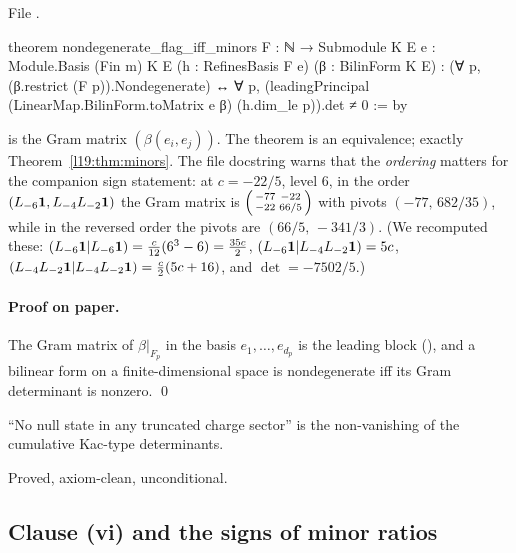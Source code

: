\noindent File .
\begin{leancode}
theorem nondegenerate_flag_iff_minors {F : ℕ → Submodule K E} {e : Module.Basis (Fin m) K E}
    (h : RefinesBasis F e) (β : BilinForm K E) :
    (∀ p, (β.restrict (F p)).Nondegenerate)
      ↔ ∀ p, (leadingPrincipal (LinearMap.BilinForm.toMatrix e β) (h.dim_le p)).det ≠ 0 := by
\end{leancode}

\begin{dictionary}
 is the Gram matrix $(\beta(e_i,e_j))$. The theorem is an
equivalence; exactly Theorem~\ref{l19:thm:minors}. The file docstring warns that the
\emph{ordering} matters for the companion sign statement: at $c=-22/5$, level $6$, in the order
$(L_{-6}\mathbf{1},L_{-4}L_{-2}\mathbf{1})$ the Gram matrix is
$\begin{psmallmatrix}-77&-22\\-22&66/5\end{psmallmatrix}$ with pivots $(-77,\,682/35)$, while in the
reversed order the pivots are $(66/5,\,-341/3)$. (We recomputed these: $(L_{-6}\mathbf{1}|L_{-6}\mathbf{1})
= \tfrac{c}{12}(6^3-6) = \tfrac{35c}{2}$, $(L_{-6}\mathbf{1}|L_{-4}L_{-2}\mathbf{1}) = 5c$,
$(L_{-4}L_{-2}\mathbf{1}|L_{-4}L_{-2}\mathbf{1}) = \tfrac c2(5c+16)$, and $\det = -7502/5$.)
\end{dictionary}

\paragraph{Proof on paper.} The Gram matrix of $\beta|_{F_p}$ in the basis $e_1,\dots,e_{d_p}$ is the
leading block (), and a bilinear form on a finite-dimensional space
is nondegenerate iff its Gram determinant is nonzero. \qed

\begin{physics}
``No null state in any truncated charge sector'' is the non-vanishing of the cumulative Kac-type
determinants.
\end{physics}

\begin{status}
Proved, axiom-clean, unconditional.
\end{status}

\subsection{Clause (vi) and the signs of minor ratios}

